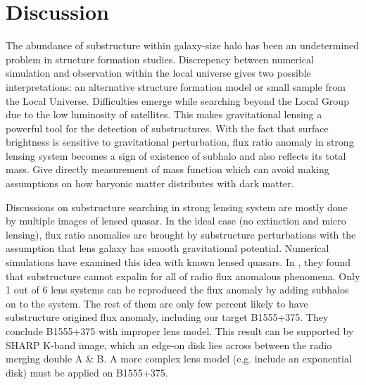 \documentclass[usenatbib]{mn2e}
\begin{document}
\section{Discussion}
The abundance of substructure within galaxy-size halo has been an undetermined problem in structure formation studies. Discrepency between numerical simulation and observation within the local universe gives two possible interpretations: an alternative structure formation model or small sample from the Local Universe. Difficulties emerge while searching beyond the Local Group due to the low luminosity of satellites. This makes gravitational lensing a powerful tool for the detection of substructures. With the fact that surface brightness is sensitive to gravitational perturbation, flux ratio anomaly in strong lensing system becomes a sign of existence of subhalo and also reflects its total mass. Give directly measurement of mass function which can avoid making assumptions on how baryonic matter distributes with dark matter.

Discussions on substructure searching in strong lensing system are mostly done by multiple images of lensed quasar. In the ideal case (no extinction and micro lensing), flux ratio anomalies are brought by substructure perturbations with the assumption that lens galaxy has smooth gravitational potential. Numerical simulations have examined this idea with known lensed quasars. In \citet{Xu14}, they found that substructure cannot expalin for all of radio flux anomalous phenomena. Only 1 out of 6 lens systems can be reproduced the flux anomaly by adding subhalos on to the system. The rest of them are only few percent likely to have substructure origined flux anomaly, including our target B1555+375. They conclude B1555+375 with improper lens model. This result can be supported by SHARP K-band image, which an edge-on disk lies across between the radio merging double A \& B. A more complex lens model (e.g. include an exponential disk) must be applied on B1555+375.
\end{document}
